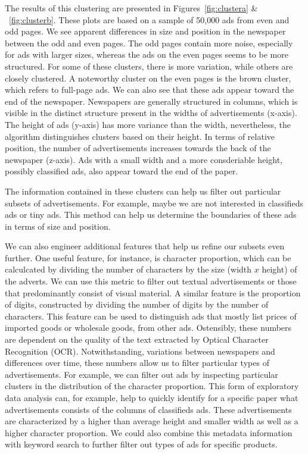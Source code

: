 \documentclass[USenglish]{article}
\begin{document}
The results of this clustering are presented in Figures~\ref{fig:clustera} \& ~\ref{fig:clusterb}. These plots are based on a sample of 50,000 ads from even and odd pages. We see apparent differences in size and position in the newspaper between the odd and even pages. The odd pages contain more noise, especially for ads with larger sizes, whereas the ads on the even pages seems to be more structured. For some of these clusters, there is more variation, while others are closely clustered. A noteworthy cluster on the even pages is the brown cluster, which refers to full-page ads. 
%
We can also see that these ads appear toward the end of the newspaper. Newspapers are generally structured in columns, which is visible in the distinct structure present in the widths of advertisements (x-axis). The height of ads (y-axis) has more variance than the width, nevertheless, the algorithm distinguishes clusters based on their height. In terms of relative position, the number of advertisements increases towards the back of the newspaper (z-axis). Ads with a small width and a more consderiable height, possibly classified ads, also appear toward the end of the paper. 

The information contained in these clusters can help us filter out particular subsets of advertisements. For example, maybe we are not interested in classifieds ads or tiny ads. This method can help us determine the boundaries of these ads in terms of size and position. 

We can also engineer additional features that help us refine our subsets even further. One useful feature, for instance, is character proportion, which can be calculcated by dividing the number of characters by the size (width $x$ height) of the adverts. We can use this metric to filter out textual advertisements or those that predominantly consist of visual material. A similar feature is the proportion of digits, constructed by dividing the number of digits by the number of characters. This feature can be used to distinguish ads that mostly list prices of imported goods or wholesale goods, from other ads. 
%
Ostensibly, these numbers are dependent on the quality of the text extracted by Optical Character Recognition (OCR). Notwithstanding, variations between newspapers and differences over time, these numbers allow us to filter particular types of advertisements. For example, we can filter out ads by inspecting particular clusters in the distribution of the character proportion. This form of exploratory data analysis can, for example, help to quickly identify for a specific paper what advertisements consists of the columns of classifieds ads. These advertisements are characterized by a higher than average height and smaller width as well as a higher character proportion. We could also combine this metadata information with keyword search to further filter out types of ads for specific products. 
\end{document}
